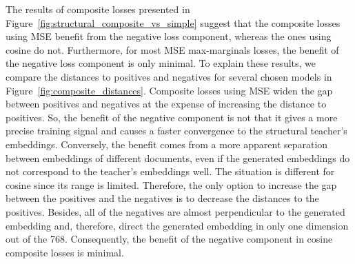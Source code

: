 The results of composite losses presented in Figure~\ref{fig:structural_composite_vs_simple} suggest that the composite
losses using MSE benefit from the negative loss component, whereas the ones
using cosine do not. Furthermore, for most MSE max-marginals losses, the benefit
of the negative loss component is only minimal. To explain these results, we
compare the distances to positives and negatives for several chosen models in
Figure~\ref{fig:composite_distances}. Composite losses using MSE widen the gap
between positives and negatives at the expense of increasing the distance to
positives. So, the benefit of the negative component is not that it gives a
more precise training signal and causes a faster convergence to the structural
teacher's embeddings. Conversely, the benefit comes from a more apparent separation
between embeddings of different documents, even if the generated embeddings do
not correspond to the teacher's embeddings well. The situation is
different for cosine since its range is limited. Therefore, the
only option to increase the gap between the positives and the negatives is
to decrease the distances to the positives. Besides, all of the negatives
are almost perpendicular to the generated embedding and, therefore, direct the
generated embedding in only one dimension out of the 768. Consequently, the
benefit of the negative component in cosine composite losses is minimal.

